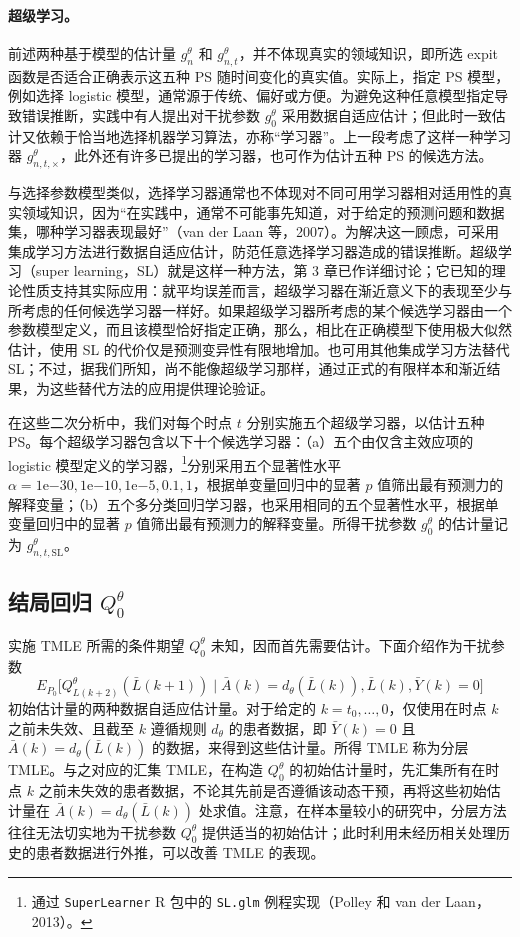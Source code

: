 \paragraph{超级学习。}
前述两种基于模型的估计量 $g_n^\theta$ 和 $g^\theta_{n,t}$，并不体现真实的领域知识，即所选 expit 函数是否适合正确表示这五种 PS 随时间变化的真实值。实际上，指定 PS 模型，例如选择 logistic 模型，通常源于传统、偏好或方便。为避免这种任意模型指定导致错误推断，实践中有人提出对干扰参数 $g_0^\theta$ 采用数据自适应估计；但此时一致估计又依赖于恰当地选择机器学习算法，亦称“学习器”。上一段考虑了这样一种学习器 $g^\theta_{n,t,\times}$，此外还有许多已提出的学习器，也可作为估计五种 PS 的候选方法。

与选择参数模型类似，选择学习器通常也不体现对不同可用学习器相对适用性的真实领域知识，因为“在实践中，通常不可能事先知道，对于给定的预测问题和数据集，哪种学习器表现最好”（van der Laan 等，2007）。为解决这一顾虑，可采用集成学习方法进行数据自适应估计，防范任意选择学习器造成的错误推断。超级学习（super learning，SL）就是这样一种方法，第 3 章已作详细讨论；它已知的理论性质支持其实际应用：就平均误差而言，超级学习器在渐近意义下的表现至少与所考虑的任何候选学习器一样好。如果超级学习器所考虑的某个候选学习器由一个参数模型定义，而且该模型恰好指定正确，那么，相比在正确模型下使用极大似然估计，使用 SL 的代价仅是预测变异性有限地增加。也可用其他集成学习方法替代 SL；不过，据我们所知，尚不能像超级学习那样，通过正式的有限样本和渐近结果，为这些替代方法的应用提供理论验证。

在这些二次分析中，我们对每个时点 $t$ 分别实施五个超级学习器，以估计五种 PS。每个超级学习器包含以下十个候选学习器：（a）五个由仅含主效应项的 logistic 模型定义的学习器，\footnote{通过 \texttt{SuperLearner} R 包中的 \texttt{SL.glm} 例程实现（Polley 和 van der Laan，2013）。}分别采用五个显著性水平 $\alpha=1\mathrm e{-30},1\mathrm e{-10},1\mathrm e{-5},0.1,1$，根据单变量回归中的显著 $p$ 值筛出最有预测力的解释变量；（b）五个多分类回归学习器，也采用相同的五个显著性水平，根据单变量回归中的显著 $p$ 值筛出最有预测力的解释变量。所得干扰参数 $g_0^\theta$ 的估计量记为 $g^\theta_{n,t,\mathrm{SL}}$。

\subsection{结局回归 \texorpdfstring{$Q_0^\theta$}{Q0θ}}

实施 TMLE 所需的条件期望 $Q_0^\theta$ 未知，因而首先需要估计。下面介绍作为干扰参数
\[
 E_{P_0}\bigl[Q^\theta_{L(k+2)}(\bar L(k+1))\mid
 \bar A(k)=d_\theta(\bar L(k)),\bar L(k),\bar Y(k)=0\bigr]
\]
初始估计量的两种数据自适应估计量。对于给定的 $k=t_0,\ldots,0$，仅使用在时点 $k$ 之前未失效、且截至 $k$ 遵循规则 $d_\theta$ 的患者数据，即 $\bar Y(k)=0$ 且 $\bar A(k)=d_\theta(\bar L(k))$ 的数据，来得到这些估计量。所得 TMLE 称为分层 TMLE。与之对应的汇集 TMLE，在构造 $Q_0^\theta$ 的初始估计量时，先汇集所有在时点 $k$ 之前未失效的患者数据，不论其先前是否遵循该动态干预，再将这些初始估计量在 $\bar A(k)=d_\theta(\bar L(k))$ 处求值。注意，在样本量较小的研究中，分层方法往往无法切实地为干扰参数 $Q_0^\theta$ 提供适当的初始估计；此时利用未经历相关处理历史的患者数据进行外推，可以改善 TMLE 的表现。

